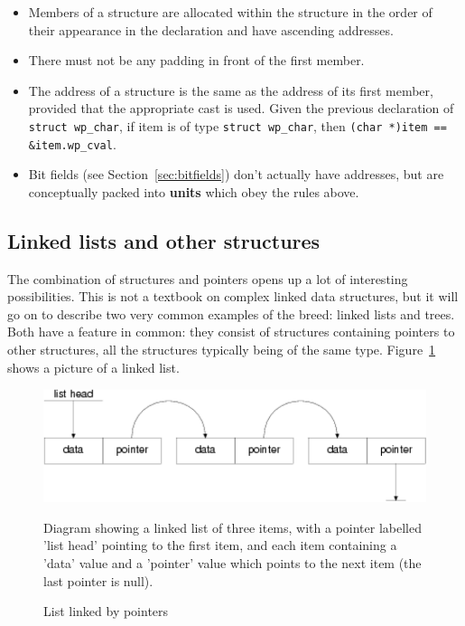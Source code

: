    \begin{itemize}
    \item Members of a structure are allocated within the structure in the
     order of their appearance in the declaration and have ascending
     addresses.

    \item There must not be any padding in front of the first member.

    \item The address of a structure is the same as the address of its first
     member, provided that the appropriate cast is used. Given the
     previous declaration of \texttt{struct wp\_char}, if item is of type
     \texttt{struct wp\_char}, then
     \texttt{(char *)item == \&item.wp\_cval}.

    \item Bit fields (see Section~\ref{sec:bitfields}) don't actually have
     addresses, but are conceptually packed into \textbf{units} which obey
     the rules above.
   \end{itemize}

  

  \subsection{Linked lists and other structures}
   

   The combination of structures and pointers opens up a lot of interesting
    possibilities. This is not a textbook on complex linked data structures,
    but it will go on to describe two very common examples of the breed: linked
    lists and trees. Both have a feature in common: they consist of structures
    containing pointers to other structures, all the structures typically being
    of the same type. Figure~\ref{fig:linkedList} shows a picture of a linked
    list.


    \begin{figure}[htb]\centering
      \includegraphics[type=pdf,read=.pdf,ext=.pdf,scale=0.8]
      {figure/6.2_linkedList}
      \caption*{Diagram showing a linked list of three items,
        with a pointer  labelled 'list head' pointing to the first item,
        and each item containing a 'data' value and a 'pointer' value
        which points to the next item (the last pointer is null).}
      \caption{\label{fig:linkedList}List linked by pointers}
   \end{figure}



